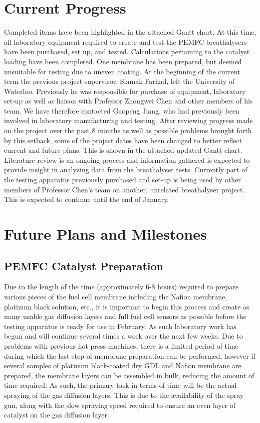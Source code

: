 \documentclass{article}
\begin{document}
	\section{Current Progress}
		Completed items have been highlighted in the attached Gantt chart.
		At this time, all laboratory equipment required to create and test the PEMFC breathalysers have been purchased, set up, and tested. Calculations pertaining to the catalyst loading have been completed. One membrane has been prepared, but deemed unsuitable for testing due to uneven coating.
		At the beginning of the current term the previous project supervisor, Siamak Farhad, left the University of Waterloo. Previously he was responsible for purchase of equipment, laboratory set-up as well as liaison with Professor Zhongwei Chen and other members of his team. We have therefore contacted Gaopeng Jiang, who had previously been involved in laboratory manufacturing and testing. After reviewing progress made on the project over the past 8 months as well as possible problems brought forth by this setback, some of the project dates have been changed to better reflect current and future plans. This is shown in the attached updated Gantt chart. Literature review is an ongoing process and information gathered is expected to provide insight in analyzing data from the breathalyser tests.
		Currently part of the testing apparatus previously purchased and set-up is being used by other members of Professor Chen's team on another, unrelated breathalyser project. This is expected to continue until the end of January.
	\section{Future Plans and Milestones}
		\subsection{PEMFC Catalyst Preparation}
			Due to the length of the time (approximately 6-8 hours) required to prepare various pieces of the fuel cell membrane including the Nafion membrane, platinum black solution, etc., it is important to begin this process and create as many usable gas diffusion layers and full fuel cell sensors as possible before the testing apparatus is ready for use in February. As such laboratory work has begun and will continue several times a week over the next few weeks.
			Due to problems with previous hot press machines, there is a limited period of time during which the last step of membrane preparation can be performed, however if several samples of platinum black-coated dry GDL and Nafion membrane are prepared, the membrane layers can be assembled in bulk, reducing the amount of time required. As such, the primary task in terms of time will be the actual spraying of the gas diffusion layers. This is due to the availability of the spray gun, along with the slow spraying speed required to ensure an even layer of catalyst on the gas diffusion layer.
\end{document}
